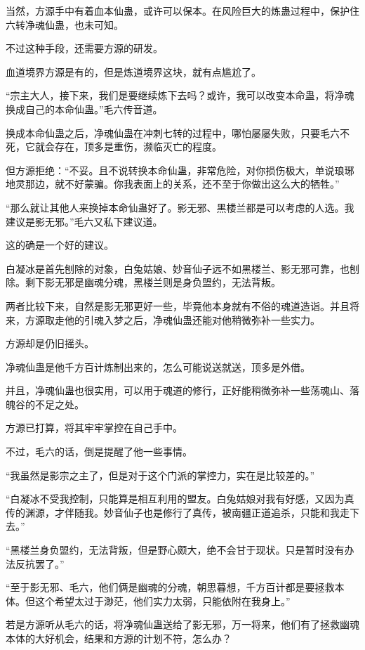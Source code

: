 \begin{this_body}
当然，方源手中有着血本仙蛊，或许可以保本。在风险巨大的炼蛊过程中，保护住六转净魂仙蛊，也未可知。

不过这种手段，还需要方源的研发。

血道境界方源是有的，但是炼道境界这块，就有点尴尬了。

“宗主大人，接下来，我们是要继续炼下去吗？或许，我可以改变本命蛊，将净魂换成自己的本命仙蛊。”毛六传音道。

换成本命仙蛊之后，净魂仙蛊在冲刺七转的过程中，哪怕屡屡失败，只要毛六不死，它就会存在，顶多是重伤，濒临灭亡的程度。

但方源拒绝：“不妥。且不说转换本命仙蛊，非常危险，对你损伤极大，单说琅琊地灵那边，就不好蒙骗。你我表面上的关系，还不至于你做出这么大的牺牲。”

“那么就让其他人来换掉本命仙蛊好了。影无邪、黑楼兰都是可以考虑的人选。我建议是影无邪。”毛六又私下建议道。

这的确是一个好的建议。

白凝冰是首先刨除的对象，白兔姑娘、妙音仙子远不如黑楼兰、影无邪可靠，也刨除。剩下影无邪是幽魂分魂，黑楼兰则是身负盟约，无法背叛。

两者比较下来，自然是影无邪更好一些，毕竟他本身就有不俗的魂道造诣。并且将来，方源取走他的引魂入梦之后，净魂仙蛊还能对他稍微弥补一些实力。

方源却是仍旧摇头。

净魂仙蛊是他千方百计炼制出来的，怎么可能说送就送，顶多是外借。

并且，净魂仙蛊也很实用，可以用于魂道的修行，正好能稍微弥补一些荡魂山、落魄谷的不足之处。

方源已打算，将其牢牢掌控在自己手中。

不过，毛六的话，倒是提醒了他一些事情。

“我虽然是影宗之主了，但是对于这个门派的掌控力，实在是比较差的。”

“白凝冰不受我控制，只能算是相互利用的盟友。白兔姑娘对我有好感，又因为真传的渊源，才伴随我。妙音仙子也是修行了真传，被南疆正道追杀，只能和我走下去。”

“黑楼兰身负盟约，无法背叛，但是野心颇大，绝不会甘于现状。只是暂时没有办法反抗罢了。”

“至于影无邪、毛六，他们俩是幽魂的分魂，朝思暮想，千方百计都是要拯救本体。但这个希望太过于渺茫，他们实力太弱，只能依附在我身上。”

若是方源听从毛六的话，将净魂仙蛊送给了影无邪，万一将来，他们有了拯救幽魂本体的大好机会，结果和方源的计划不符，怎么办？


\end{this_body}
